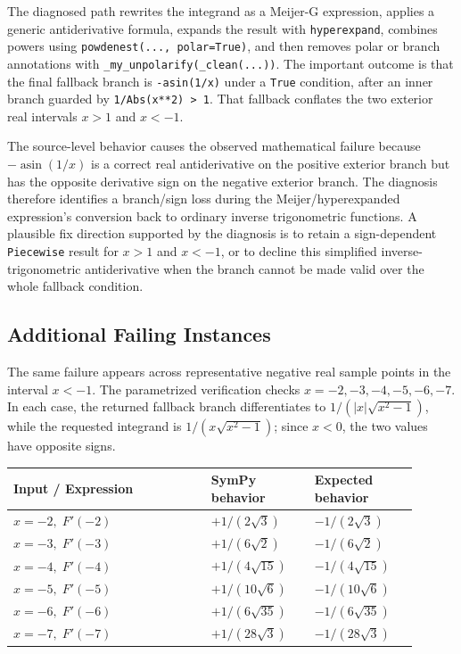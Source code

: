 \documentclass[11pt]{article}
\begin{document}
The diagnosed path rewrites the integrand as a Meijer-G expression, applies a
generic antiderivative formula, expands the result with \texttt{hyperexpand},
combines powers using \texttt{powdenest(..., polar=True)}, and then removes
polar or branch annotations with \texttt{\_my\_unpolarify(\_clean(...))}.  The
important outcome is that the final fallback branch is \texttt{-asin(1/x)} under
a \texttt{True} condition, after an inner branch guarded by
\texttt{1/Abs(x**2) > 1}.  That fallback conflates the two exterior real
intervals \(x>1\) and \(x<-1\).

The source-level behavior causes the observed mathematical failure because
\(-\operatorname{asin}(1/x)\) is a correct real antiderivative on the positive exterior branch
but has the opposite derivative sign on the negative exterior branch.  The
diagnosis therefore identifies a branch/sign loss during the
Meijer/hyperexpanded expression's conversion back to ordinary inverse
trigonometric functions.  A plausible fix direction supported by the diagnosis
is to retain a sign-dependent \texttt{Piecewise} result for \(x>1\) and \(x<-1\),
or to decline this simplified inverse-trigonometric antiderivative when the
branch cannot be made valid over the whole fallback condition.

\subsection{Additional Failing Instances}

The same failure appears across representative negative real sample points in
the interval \(x<-1\).  The parametrized verification checks
\(x=-2,-3,-4,-5,-6,-7\).  In each case, the returned fallback branch
differentiates to \(1/(|x|\sqrt{x^2-1})\), while the requested integrand is
\(1/(x\sqrt{x^2-1})\); since \(x<0\), the two values have opposite signs.

\begin{center}
\small
\renewcommand{\arraystretch}{1.3}
\begin{tabular}{@{}>{\raggedright\arraybackslash}p{0.44\linewidth}>{\raggedright\arraybackslash}p{0.23\linewidth}>{\raggedright\arraybackslash}p{0.23\linewidth}@{}}
\toprule
\textbf{Input / Expression} & \textbf{SymPy behavior} & \textbf{Expected behavior} \\
\midrule
\(x=-2,\; F'(-2)\) & \(+1/(2\sqrt{3})\) & \(-1/(2\sqrt{3})\) \\
\(x=-3,\; F'(-3)\) & \(+1/(6\sqrt{2})\) & \(-1/(6\sqrt{2})\) \\
\(x=-4,\; F'(-4)\) & \(+1/(4\sqrt{15})\) & \(-1/(4\sqrt{15})\) \\
\(x=-5,\; F'(-5)\) & \(+1/(10\sqrt{6})\) & \(-1/(10\sqrt{6})\) \\
\(x=-6,\; F'(-6)\) & \(+1/(6\sqrt{35})\) & \(-1/(6\sqrt{35})\) \\
\(x=-7,\; F'(-7)\) & \(+1/(28\sqrt{3})\) & \(-1/(28\sqrt{3})\) \\
\bottomrule
\end{tabular}
\end{center}
\end{document}
